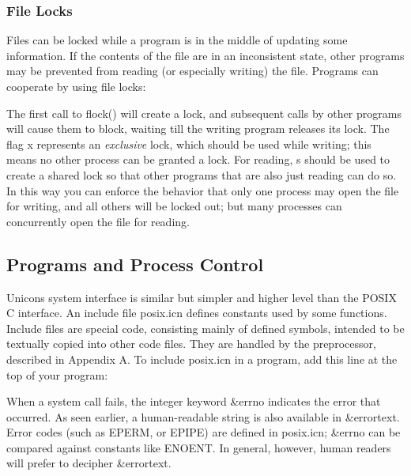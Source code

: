 \subsubsection{File Locks}

Files can be locked while a program is in the middle of
updating some information. If the contents of the file are in an
inconsistent state, other programs may be prevented from reading (or
especially writing) the file. Programs can cooperate by using file
locks:


The first call to \textsf{flock()} will create a lock, and subsequent
calls by other programs will cause them to block, waiting till the
writing program releases its lock. The flag
\textsf{{\textquotedbl}x{\textquotedbl}} represents an
\textit{exclusive} lock, which should be used while writing; this means
no other process can be granted a lock. For reading,
\textsf{{\textquotedbl}s{\textquotedbl}} should be used to create a
shared lock so that other programs that are also just reading can do
so. In this way you can enforce the behavior that only one process may
open the file for writing, and all others will be locked out; but many
processes can concurrently open the file for reading.

\subsection{Programs and Process Control}
Unicon{\textquotesingle}s system interface is similar but simpler and
higher level than the POSIX C interface. An include file
\textsf{posix.icn} defines constants used by some functions. Include
files are special code, consisting mainly of defined symbols, intended
to be textually copied into other code files. They are handled by the
preprocessor, described in Appendix A. To include \textsf{posix.icn} in
a program, add this line at the top of your program:


When a system call fails, the integer keyword
\textsf{\&errno} indicates the error that occurred. As seen earlier, a
human-readable string is also available in \textsf{\&errortext}. Error codes (such as \textsf{EPERM}, or
\textsf{EPIPE}) are defined in \textsf{posix.icn}; \textsf{\&errno} can be compared against constants like
\textsf{ENOENT}. In general, however, human readers will prefer to
decipher \textsf{\&errortext}.

